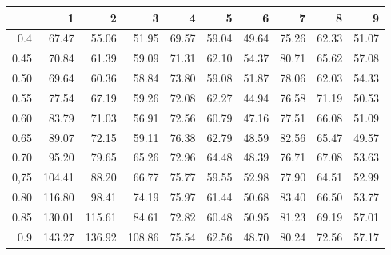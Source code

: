 \begin{table}[ht]
\centering
\begin{tabular}{rrrrrrrrrr}
  \hline
 & 1 & 2 & 3 & 4 & 5 & 6 & 7 & 8 & 9 \\ 
  \hline
0.4 & 67.47 & 55.06 & 51.95 & 69.57 & 59.04 & 49.64 & 75.26 & 62.33 & 51.07 \\ 
  0.45 & 70.84 & 61.39 & 59.09 & 71.31 & 62.10 & 54.37 & 80.71 & 65.62 & 57.08 \\ 
  0.50 & 69.64 & 60.36 & 58.84 & 73.80 & 59.08 & 51.87 & 78.06 & 62.03 & 54.33 \\ 
  0.55 & 77.54 & 67.19 & 59.26 & 72.08 & 62.27 & 44.94 & 76.58 & 71.19 & 50.53 \\ 
  0.60 & 83.79 & 71.03 & 56.91 & 72.56 & 60.79 & 47.16 & 77.51 & 66.08 & 51.09 \\ 
  0.65 & 89.07 & 72.15 & 59.11 & 76.38 & 62.79 & 48.59 & 82.56 & 65.47 & 49.57 \\ 
  0.70 & 95.20 & 79.65 & 65.26 & 72.96 & 64.48 & 48.39 & 76.71 & 67.08 & 53.63 \\ 
  0,75 & 104.41 & 88.20 & 66.77 & 75.77 & 59.55 & 52.98 & 77.90 & 64.51 & 52.99 \\ 
  0.80 & 116.80 & 98.41 & 74.19 & 75.97 & 61.44 & 50.68 & 83.40 & 66.50 & 53.77 \\ 
  0.85 & 130.01 & 115.61 & 84.61 & 72.82 & 60.48 & 50.95 & 81.23 & 69.19 & 57.01 \\ 
  0.9 & 143.27 & 136.92 & 108.86 & 75.54 & 62.56 & 48.70 & 80.24 & 72.56 & 57.17 \\ 
   \hline
\end{tabular}
\end{table}
